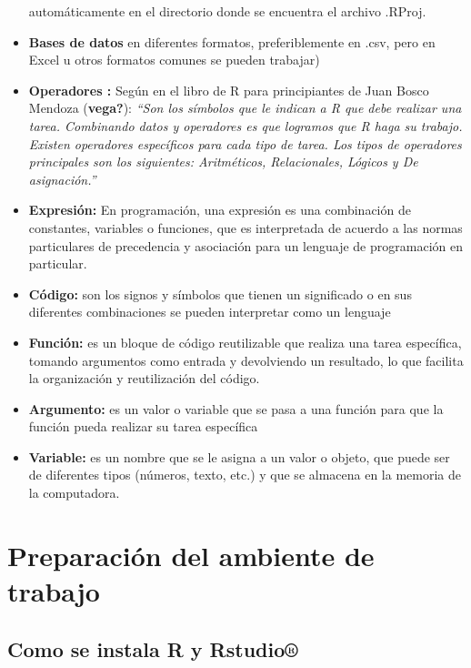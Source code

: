 \documentclass[
  letterpaper,
  DIV=11,
  numbers=noendperiod]{scrreprt}
\begin{document}
\begin{itemize}
  automáticamente en el directorio donde se encuentra el archivo .RProj.
\item
  \textbf{Bases de datos} en diferentes formatos, preferiblemente en
  .csv, pero en Excel u otros formatos comunes se pueden trabajar)
\item
  \textbf{Operadores :} Según en el libro de R para principiantes de
  Juan Bosco Mendoza (\textbf{vega?}): \emph{``Son los símbolos que le
  indican a R que debe realizar una tarea. Combinando datos y operadores
  es que logramos que R haga su trabajo. Existen operadores específicos
  para cada tipo de tarea. Los tipos de operadores principales son los
  siguientes: Aritméticos, Relacionales, Lógicos y De asignación.''}
\item
  \textbf{Expresión:} En programación, una expresión es una combinación
  de constantes, variables o funciones, que es interpretada de acuerdo a
  las normas particulares de precedencia y asociación para un lenguaje
  de programación en particular.
\item
  \textbf{Código:} son los signos y símbolos que tienen un significado o
  en sus diferentes combinaciones se pueden interpretar como un lenguaje
\item
  \textbf{Función:} es un bloque de código reutilizable que realiza una
  tarea específica, tomando argumentos como entrada y devolviendo un
  resultado, lo que facilita la organización y reutilización del código.
\item
  \textbf{Argumento:} es un valor o variable que se pasa a una función
  para que la función pueda realizar su tarea específica
\item
  \textbf{Variable:} es un nombre que se le asigna a un valor o objeto,
  que puede ser de diferentes tipos (números, texto, etc.) y que se
  almacena en la memoria de la computadora.
\end{itemize}


\chapter{Preparación del ambiente de
trabajo}\label{preparaciuxf3n-del-ambiente-de-trabajo}

\section{Como se instala R y
Rstudio®}\label{como-se-instala-r-y-rstudio}
\end{document}
